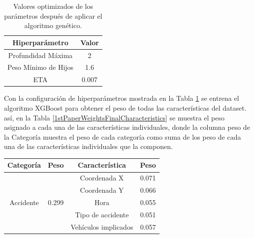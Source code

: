 \documentclass{uathesis-es}
\begin{document}
{		%
		\begin{table}[h]
			\centering
			\begin{tabular}{ |c|c| } 
				\hline
				\textbf{Hiperparámetro} & \textbf{Valor}\\
				\hline
				Profundidad Máxima & 2 \\
				Peso Mínimo de Hijos & 1.6 \\ 
				ETA & 0.007 \\
				\hline
			\end{tabular}
			\caption{Valores optimizados de los parámetros después de aplicar el algoritmo genético.}
			\label{BestGASolutionTable}
		\end{table}
		
		
		Con la configuración de hiperparámetros mostrada en la Tabla \ref{BestGASolutionTable} se entrena el algoritmo XGBoost para obtener el peso de todas las  características del dataset. así, en la Tabla \ref{1stPaperWeightsFinalCharacteristics} se muestra el peso asignado a cada una de las características individuales, donde la columna peso de la Categoría muestra el peso de cada categoría como suma de los peso de cada una de las  características individuales que la componen.
		
		
		\begin{table}[ht]
			\centering
			\begin{tabular}{ |c|c||c|c| }
				\hline
				\textbf{Categoría} & \textbf{Peso} & \textbf{Característica} & \textbf{Peso}\\
				\hline
				\hline
				\multirow{5}{*}{Accidente}   & \multirow{5}{*}{0.299} & Coordenada X & 0.071\\
				&  & Coordenada Y  & 0.066\\
				&  & Hora & 0.055\\
				&  & Tipo de accidente  & 0.051\\
				&  & Vehículos implicados & 0.057\\
				\hline
				

\end{tabular}
\end{table}}
\end{document}
